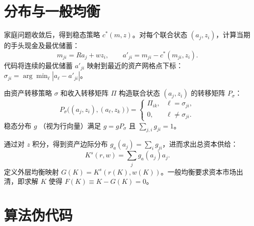 \documentclass[UTF8,a4paper,12pt]{ctexart}
\newcommand{\R}{R}
\begin{document}
\section{分布与一般均衡}

家庭问题收敛后，得到稳态策略 $c^\ast(m,z)$。对每个联合状态 $(a_j,z_i)$，计算当期的手头现金及最优储蓄：
\[
    m_{ji}=\R a_j+wz_i,\qquad a'_{ji}=m_{ji}-c^\ast(m_{ji},z_i).
\]
代码将连续的最优储蓄 $a'_{ji}$ 映射到最近的资产网格点下标：$\sigma_{ji} = \arg\min_\ell |a_\ell-a'_{ji}|$。

由资产转移策略 $\sigma$ 和收入转移矩阵 $\Pi$ 构造联合状态 $(a_j, z_i)$ 的转移矩阵 $P_\sigma$：
\[
    P_\sigma\big((a_j,z_i),(a_\ell,z_k)\big)
    =
    \begin{cases}
        \Pi_{ik}, & \ell=\sigma_{ji},\\
        0, & \ell\neq\sigma_{ji}.
    \end{cases}
\]
稳态分布 $g$ （视为行向量）满足 $g=gP_\sigma$ 且 $\sum_{j,i}g_{ji}=1$。

通过对 $z$ 积分，得到资产边际分布 $g_a(a_j)=\sum_i g_{ji}$，进而求出总资本供给：
\[
    K^s(r,w)=\sum_j g_a(a_j)a_j.
\]
定义外层均衡映射 $G(K)=K^s(r(K),w(K))$。一般均衡要求资本市场出清，即求解 $K$ 使得 $F(K)\equiv K-G(K)=0$。

\section{算法伪代码}
\end{document}
